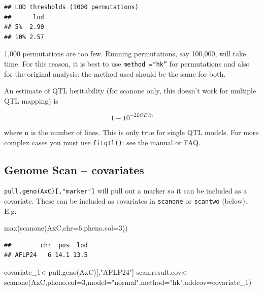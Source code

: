 \documentclass[
]{book}
\newenvironment{Shaded}{\begin{snugshade}}{\end{snugshade}}
\newcommand{\AttributeTok}[1]{\textcolor[rgb]{0.77,0.63,0.00}{#1}}
\newcommand{\DecValTok}[1]{\textcolor[rgb]{0.00,0.00,0.81}{#1}}
\newcommand{\FunctionTok}[1]{\textcolor[rgb]{0.00,0.00,0.00}{#1}}
\newcommand{\NormalTok}[1]{#1}
\newcommand{\OtherTok}[1]{\textcolor[rgb]{0.56,0.35,0.01}{#1}}
\newcommand{\StringTok}[1]{\textcolor[rgb]{0.31,0.60,0.02}{#1}}
\begin{document}
\begin{verbatim}
## LOD thresholds (1000 permutations)
##      lod
## 5%  2.90
## 10% 2.57
\end{verbatim}

1,000 permutations are too few. Running permutations, say 100,000, will take time. For this reason, it is best to use \texttt{method\ ="hk”} for permutations and also for the original analysis: the method used should be the same for both.

An estimate of QTL heritability (for scanone only, this doesn't work for multiple QTL mapping) is

\[1-10 ^{-2LOD/n}\]

where n is the number of lines. This is only true for single QTL models. For more complex cases you must use \texttt{fitqtl()}: see the manual or FAQ.

\hypertarget{genome-scan-covariates}{%
\subsection{Genome Scan -- covariates}\label{genome-scan-covariates}}

\texttt{pull.geno(AxC){[},"marker"{]}} will pull out a marker so it can be included as a covariate. These can be included as covariates in \texttt{scanone} or \texttt{scantwo} (below). E.g.

\begin{Shaded}
\begin{Highlighting}[]
\FunctionTok{max}\NormalTok{(}\FunctionTok{scanone}\NormalTok{(AxC,}\AttributeTok{chr=}\DecValTok{6}\NormalTok{,}\AttributeTok{pheno.col=}\DecValTok{3}\NormalTok{)) }
\end{Highlighting}
\end{Shaded}

\begin{verbatim}
##        chr  pos  lod
## AFLP24   6 14.1 13.5
\end{verbatim}

\begin{Shaded}
\begin{Highlighting}[]
\NormalTok{covariate\_1}\OtherTok{\textless{}{-}}\FunctionTok{pull.geno}\NormalTok{(AxC)[,}\StringTok{"AFLP24"}\NormalTok{] }
\NormalTok{scan.result.cov}\OtherTok{\textless{}{-}}\FunctionTok{scanone}\NormalTok{(AxC,}\AttributeTok{pheno.col=}\DecValTok{3}\NormalTok{,}\AttributeTok{model=}\StringTok{"normal"}\NormalTok{,}\AttributeTok{method=}\StringTok{"hk"}\NormalTok{,}\AttributeTok{addcov=}\NormalTok{covariate\_1) }
\end{Highlighting}
\end{Shaded}
\end{document}
